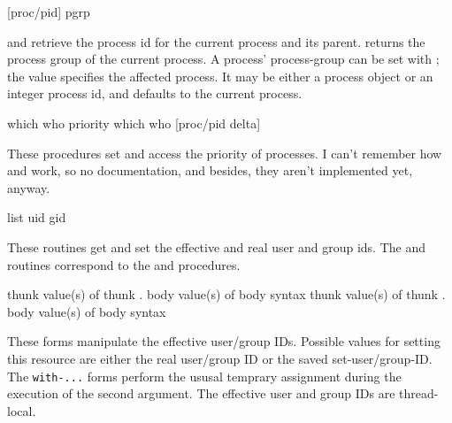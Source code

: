  \fixnum
{} \fixnum
{} {} \fixnum
{} {[proc/pid] pgrp} \undefined %
\begin{desc}    
 and  retrieve the process id for the 
current process and its parent.
 returns the process group of the current process.
A process' process-group can be set with ; 
the value  specifies the affected process. It may be either
a process object or an integer process id, and defaults to the current
process.
\end{desc}

 {which who priority} \undefined %
 {which who} \fixnum %
 {[proc/pid delta]} \undefined %
\begin{desc}
These procedures set and access the priority of processes. 
I can't remember how  and  work, so no
    documentation, and besides, they aren't implemented yet, anyway.
\end{desc}

 \str
{} \fixnum 
{} \fixnum
{} {{\fixnum} list}
 {uid} \undefined
{} {gid} \undefined
\begin{desc}
These routines get and set the effective and real user and group ids.    
The  and  routines correspond to the {\Posix}
 and  procedures.
\end{desc}

 \fixnum
{} \undefined
{} {\fixnum{} thunk}  {value(s) of thunk}
  {\fixnum{} . body} {value(s) of body} {syntax}
 \fixnum
{} \undefined
{} {\fixnum{} thunk}  {value(s) of thunk}
  {\fixnum{} . body} {value(s) of body} {syntax}

\begin{desc}
  These forms manipulate the effective user/group IDs. Possible values
  for setting this resource are either the real user/group ID or the
  saved set-user/group-ID. The \texttt{with-...} forms perform the ususal
  temprary assignment during the execution of the second argument. The
  effective user and group IDs are thread-local.
\end{desc}

